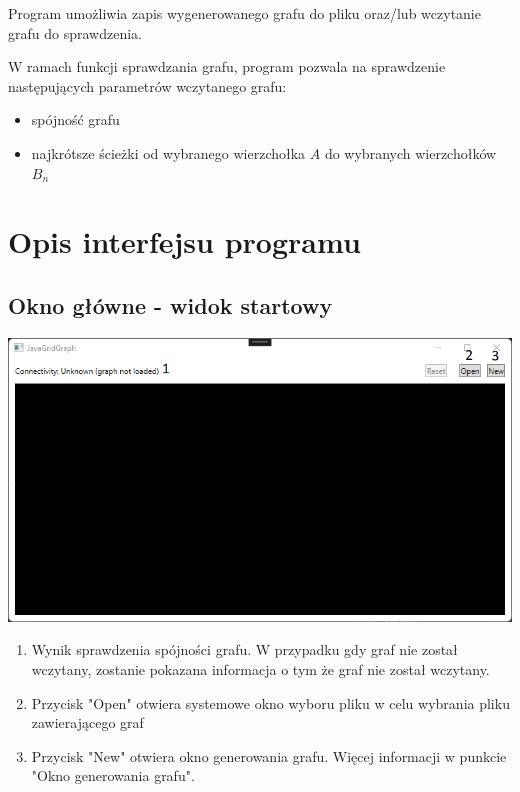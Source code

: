 \documentclass[11pt,a4paper]{report}
\begin{document}
    Program umożliwia zapis wygenerowanego grafu do pliku oraz/lub wczytanie grafu do sprawdzenia.
    
    \vspace{4em}

    W ramach funkcji sprawdzania grafu, program pozwala na sprawdzenie następujących parametrów wczytanego grafu:

    \begin{itemize}
        \item spójność grafu
        \item najkrótsze ścieżki od wybranego wierzchołka $A$ do wybranych wierzchołków $B_n$
    \end{itemize}




    \newpage
    \section{Opis interfejsu programu}

    \subsection{Okno główne - widok startowy}

    \includegraphics[width=\textwidth]{view1.png}

    \begin{enumerate}
        \item Wynik sprawdzenia spójności grafu. W przypadku gdy graf nie został wczytany, zostanie pokazana informacja o tym że graf nie został wczytany.
        \item Przycisk "Open" otwiera systemowe okno wyboru pliku w celu wybrania pliku zawierającego graf
        \item Przycisk "New" otwiera okno generowania grafu. Więcej informacji w punkcie "Okno generowania grafu".
    \end{enumerate}
\end{document}
